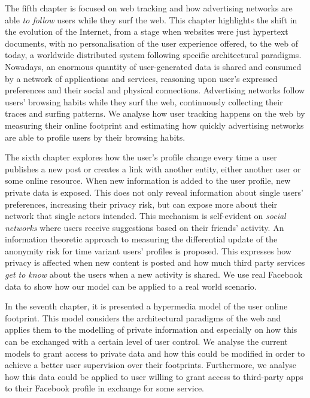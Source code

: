 The fifth chapter is focused on web tracking and how advertising networks are able \emph{to follow} users while they surf the web. This chapter highlights the shift in the evolution of the Internet, from a stage when websites were just hypertext documents, with no personalisation of the user experience offered, to the web of today, a worldwide distributed system following specific architectural paradigms. Nowadays, an enormous quantity of user-generated data is shared and consumed by a network of applications and services, reasoning upon user's expressed preferences and their social and physical connections. Advertising networks follow users’ browsing habits while they surf the web, continuously collecting their traces and surfing patterns. We analyse how user tracking happens on the web by measuring their online footprint and estimating how quickly advertising networks are able to profile users by their browsing habits.

The sixth chapter explores how the user's profile change every time a user publishes a new post or creates a link with another entity, either another user or some online resource. When new information is added to the user profile, new private data is exposed. This does not only reveal information about single users' preferences, increasing their privacy risk, but can expose more about their network that single actors intended. This mechanism is self-evident on \emph{social networks} where users receive suggestions based on their friends’ activity. An information theoretic approach to measuring the differential update of the anonymity risk for time variant users’ profiles is proposed. This expresses how privacy is affected when new content is posted and how much third party services \emph{get to know} about the users when a new activity is shared. We use real Facebook data to show how our model can be applied to a real world scenario.

In the seventh chapter, it is presented a hypermedia model of the user online footprint. This model considers the architectural paradigms of the web and applies them to the modelling of private information and especially on how this can be exchanged with a certain level of user control. We analyse the current models to grant access to private data and how this could be modified in order to achieve a better user supervision over their footprints. Furthermore, we analyse how this data could be applied to user willing to grant access to third-party apps to their Facebook profile in exchange for some service.
